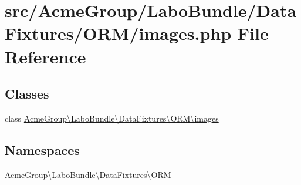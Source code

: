 \hypertarget{images_8php}{\section{src/\+Acme\+Group/\+Labo\+Bundle/\+Data\+Fixtures/\+O\+R\+M/images.php File Reference}
\label{images_8php}
}
\subsection*{Classes}
\begin{DoxyCompactItemize}
\item 
class \hyperlink{class_acme_group_1_1_labo_bundle_1_1_data_fixtures_1_1_o_r_m_1_1images}{Acme\+Group\textbackslash{}\+Labo\+Bundle\textbackslash{}\+Data\+Fixtures\textbackslash{}\+O\+R\+M\textbackslash{}images}
\end{DoxyCompactItemize}
\subsection*{Namespaces}
\begin{DoxyCompactItemize}
\item 
 \hyperlink{namespace_acme_group_1_1_labo_bundle_1_1_data_fixtures_1_1_o_r_m}{Acme\+Group\textbackslash{}\+Labo\+Bundle\textbackslash{}\+Data\+Fixtures\textbackslash{}\+O\+R\+M}
\end{DoxyCompactItemize}
